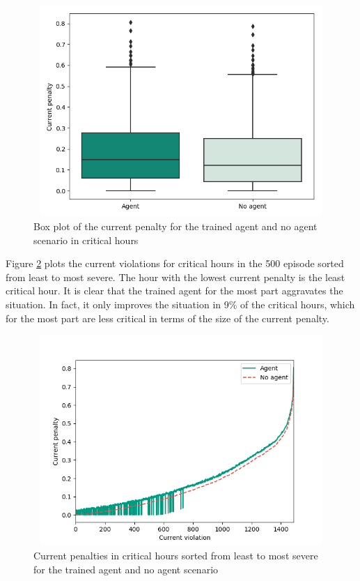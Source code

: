 \documentclass[class=book, crop=false, 11pt]{standalone}
\begin{document}
\begin{figure}[h]
    \center
\includegraphics[height=8cm, width=12cm]{figures/config1_current_boxplot.png}
    \caption {Box plot of the current penalty for the trained agent and no agent scenario in critical hours}
    \label{fig:results:config1_current_boxplot}
\end{figure}
Figure \ref{fig:results:config1_sorted_current} plots the current violations for critical hours in the 500 episode sorted from least to most severe. The hour with the lowest current penalty is the least critical hour. It is clear that the trained agent for the most part aggravates the situation. In fact, it only improves the situation in 9\% of the critical hours, which for the most part are less critical in terms of the size of the current penalty. 

\begin{figure}[h]
    \center
\includegraphics[height=8cm, width=12cm]{figures/config1_sorted_current.png}
    \caption {Current penalties in critical hours sorted from least to most severe for the trained agent and no agent scenario}
    \label{fig:results:config1_sorted_current}
\end{figure}
\end{document}
